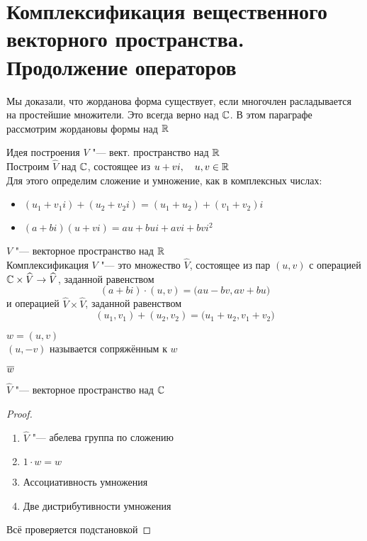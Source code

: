 \section{Комплексификация вещественного векторного пространства. Продолжение операторов}

Мы доказали, что жорданова форма существует, если многочлен расладывается на простейшие множители. Это всегда верно над $ \mathbb{C} $. В этом параграфе рассмотрим жордановы формы над $ \mathbb{R} $

\begin{undefthm}{Идея построения}
	$ V $ "--- вект. пространство над $ \mathbb{R} $ \\
	Построим $ \hat{V} $ над $ \mathbb{C} $, состоящее из $ u + vi, \quad u, v \in \mathbb{R} $ \\
	Для этого определим сложение и умножение, как в комплексных числах:
	\begin{itemize}
		\item $ (u_1 + v_1i) + (u_2 + v_2i) = (u_1 + u_2) + (v_1 + v_2)i $
		\item $ (a + bi)(u + vi) = au + bui + avi + bvi^2 $
	\end{itemize}
\end{undefthm}

\begin{definition}
	$ V $ "--- векторное пространство над $ \mathbb{R} $ \\
	Комплексификация $ V $ "--- это множество $ \hat{V} $, состоящее из пар $ (u, v) $ с операцией $ \mathbb{C} \times \widehat{V} \to \widehat{V} $, заданной равенством
	$$ (a + bi) \cdot (u, v) = \big( au - bv, av + bu \big) $$
	и операцией $ \hat{V} \times \hat{V} $, заданной равенством
	$$ (u_1, v_1) + (u_2, v_2) = \big( u_1 + u_2, v_1 + v_2 \big) $$
\end{definition}

\begin{definition}
	$ w = (u, v) $ \\
	$ (u, -v) $ называется сопряжённым к $ w $
\end{definition}

\begin{notation}
	$ \overline{w} $
\end{notation}

\begin{theorem}
	$ \hat{V} $ "--- векторное пространство над $ \mathbb{C} $
\end{theorem}

\begin{proof}
	\hfill
	\begin{enumerate}
		\item $ \hat{V} $ "--- абелева группа по сложению
		\item $ 1 \cdot w = w $
		\item Ассоциативность умножения
		\item Две дистрибутивности умножения
	\end{enumerate}
	Всё проверяется подстановкой
\end{proof}


